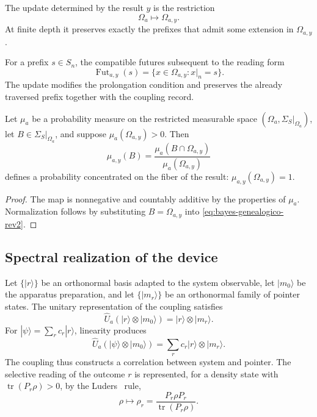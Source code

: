 \begin{definition}
The update determined by the result \(y\) is the restriction
\[
 \Omega_a\longmapsto\Omega_{a,y}.
\]
At finite depth it preserves exactly the prefixes that admit some
extension in \(\Omega_{a,y}\).
\end{definition}

For a prefix \(s\in S_n\), the compatible futures subsequent to the
reading form
\[
 \operatorname{Fut}_{a,y}(s)
 =\{x\in\Omega_{a,y}:x|_n=s\}.
\]
The update modifies the prolongation condition and preserves the already
traversed prefix together with the coupling record.

\begin{proposition}
\label{prop:probabilidad-condicionada-medida-rev2}
Let \(\mu_a\) be a probability measure on the restricted measurable space
\((\Omega_a,\Sigma_S|_{\Omega_a})\), let
\(B\in\Sigma_S|_{\Omega_a}\), and suppose
\(\mu_a(\Omega_{a,y})>0\). Then
\begin{equation}
 \mu_{a,y}(B)
 =\frac{\mu_a(B\cap\Omega_{a,y})}
        {\mu_a(\Omega_{a,y})}
 \label{eq:bayes-genealogico-rev2}
\end{equation}
defines a probability concentrated on the fiber of the result:
\(\mu_{a,y}(\Omega_{a,y})=1\).
\end{proposition}

\begin{proof}
The map is nonnegative and countably additive by the properties of
\(\mu_a\). Normalization follows by substituting
\(B=\Omega_{a,y}\) into \eqref{eq:bayes-genealogico-rev2}.
\end{proof}

\subsection{Spectral realization of the device}

Let \(\{|r\rangle\}\) be an orthonormal basis adapted to the system observable,
let \(|m_0\rangle\) be the apparatus preparation, and let
\(\{|m_r\rangle\}\) be an orthonormal family of pointer states. The
unitary representation of the coupling satisfies
\begin{equation}
 \widehat U_a(|r\rangle\otimes|m_0\rangle)
 =|r\rangle\otimes|m_r\rangle.
 \label{eq:premedicion-espectral-rev2}
\end{equation}
For \(|\psi\rangle=\sum_r c_r|r\rangle\), linearity produces
\[
 \widehat U_a(|\psi\rangle\otimes|m_0\rangle)
 =\sum_r c_r|r\rangle\otimes|m_r\rangle.
\]
The coupling thus constructs a correlation between system and pointer. The
selective reading of the outcome \(r\) is represented, for a density state
with \(\operatorname{tr}(P_r\rho)>0\), by the
Luders~\cite{Lueders1950} rule,
\begin{equation}
 \rho\longmapsto
 \rho_r=\frac{P_r\rho P_r}{\operatorname{tr}(P_r\rho)}.
 \label{eq:luders-genealogico-rev2}
\end{equation}

